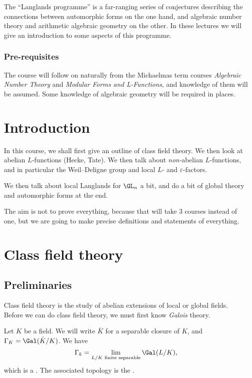 \documentclass[a4paper]{article}
\begin{document}
\maketitle
{\small
\setlength{\parindent}{0em}
\setlength{\parskip}{1em}
The ``Langlands programme'' is a far-ranging series of conjectures describing the connections between automorphic forms on the one hand, and algebraic number theory and arithmetic algebraic geometry on the other. In these lectures we will give an introduction to some aspects of this programme.

\subsubsection*{Pre-requisites}
The course will follow on naturally from the Michaelmas term courses \emph{Algebraic Number Theory} and \emph{Modular Forms and L-Functions}, and knowledge of them will be assumed. Some knowledge of algebraic geometry will be required in places.
}
\tableofcontents

\setcounter{section}{-1}
\section{Introduction}
In this course, we shall first give an outline of class field theory. We then look at abelian $L$-functions (Hecke, Tate). We then talk about \emph{non-}abelian $L$-functions, and in particular the Weil--Deligne group and local $L$- and $\varepsilon$-factors.

We then talk about local Langlands for $\GL_n$ a bit, and do a bit of global theory and automorphic forms at the end.

The aim is not to prove everything, because that will take 3 courses instead of one, but we are going to make precise definitions and statements of everything.

\section{Class field theory}
\subsection{Preliminaries}
Class field theory is the study of abelian extensions of local or global fields. Before we can do class field theory, we must first know \emph{Galois} theory.
\begin{notation}
  Let $K$ be a field. We will write $\bar{K}$ for a separable closure of $K$, and $\Gamma_K = \Gal(\bar{K}/K)$. We have
  \[
    \Gamma_k = \lim_{L/K\text{ finite separable}} \Gal(L/K),
  \]
  which is a . The associated topology is the .
\end{notation}
\end{document}
